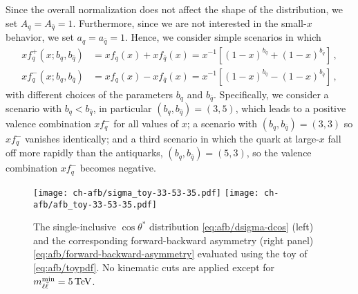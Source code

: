 Since the overall normalization does not affect the shape of the distribution,
we set $A_q=A_{\bar{q}}=1$.
%
Furthermore, since we are not interested in the small-$x$ behavior, we set
$a_q=a_{\bar{q}}=1$. 
%
Hence, we consider simple scenarios in which 
\begin{align}\label{eq:afb/toyp}
xf_q^+(x; b_q,b_{\bar{q}}) &= xf_q(x)+xf_{\bar{q}}(x) = x^{-1}\left[ (1-x)^{b_q} +(1-x)^{b_{\bar{q}}}  \right]  \,, \\\label{eq:afb/toym}
xf_q^-(x; b_q,b_{\bar{q}}) &= xf_q(x)-xf_{\bar{q}}(x) = x^{-1}\left[ (1-x)^{b_q} -(1-x)^{b_{\bar{q}}}  \right]  \,, 
\end{align}
with different choices of the parameters  $b_q$ and $b_{\bar{q}}$.
Specifically, we consider a scenario with $b_q < b_{\bar{q}}$, in particular
$(b_q,b_{\bar{q}})=(3,5)$, which leads to a positive valence combination
$xf_q^-$ for all values of $x$; a scenario with $(b_q,b_{\bar{q}})=(3,3)$ so 
$xf_q^-$ vanishes identically; and a third scenario in which the quark \pdfs at
large-$x$ fall off more rapidly than the antiquarks, $(b_q,b_{\bar{q}})=(5,3)$,
so the valence combination $xf_q^-$ becomes negative.

\begin{figure}[!t]
 \centering
 \texttt{[image: ch-afb/sigma\_toy-33-53-35.pdf]}
 \texttt{[image: ch-afb/afb\_toy-33-53-35.pdf]}
 \caption{The single-inclusive $\cos\theta^*$ distribution
   \cref{eq:afb/dsigma-dcos}  (left)
   and the corresponding forward-backward asymmetry
   (right panel) \cref{eq:afb/forward-backward-asymmetry} evaluated using 
    the toy \pdfs of \cref{eq:afb/toypdf}.
   No  kinematic cuts are applied except for $\mll^{\text{min}}=\SI{5}{\tera\electronvolt}$.
 }    
 \label{fig:afb/sigma_toy}
\end{figure}


